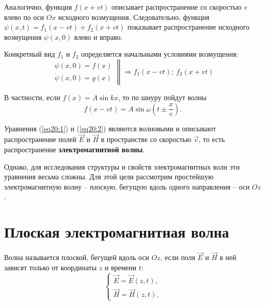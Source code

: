 	Аналогично, функция \( f(x + vt) \) описывает распространение со скоростью
    \( v \) влево по оси \( Ox \) исходного возмущения. Следовательно, функция
    \( \psi(x, t) = f_1(x - vt) + f_2(x + vt) \) показывает распространение
    исходного возмущения \( \psi(x, 0) \) влево и вправо.
	
	Конкретный вид \( f_1 \) и \( f_2 \) определяется начальными условиями
    возмущения:
	\[
        \left.
        \begin{array}{l}
            \psi(x, 0) = f(x) \\
            \dot{\psi}(x, 0) = g(x)
        \end{array}
        \right\|
        \Rightarrow f_1(x -vt); \ f_2(x + vt)
    \]
	
	В частности, если \( f(x) = A\sin kx \), то по шнуру пойдут волны
	\[
        f(x - vt) = A\sin\omega\left(t \pm \frac{x}{v}\right).
    \]
	
	\begin{conclusion}
        Уравнения (\ref{eq20:1}) и (\ref{eq20:2}) являются волновыми и описывают
        распространение полей \( \vec{E} \) и \( \vec{H} \) в пространстве со
        скоростью \( \vec{v} \), то есть распространение
        \textbf{электромагнитной волны}.
	\end{conclusion}
	
	Однако, для исследования структуры и свойств электромагнитных волн эти
    уравнения весьма сложны. Для этой цели рассмотрим простейшую
    электромагнитную волну -- \textit{плоскую}, бегущую вдоль одного направления
    -- оси \( Oz \).
	
\section{Плоская электромагнитная волна}

	\begin{definition}
        Волна называется плоской, бегущей вдоль оси \( Oz \), если поля
        \( \vec{E} \) и \( \vec{H} \) в ней зависят только от координаты
        \( z \) и времени \( t \):
        \[
            \left\{
            \begin{array}{l}
                \vec{E} = \vec{E}(z, t), \\
                \vec{H} = \vec{H}(z, t).
            \end{array}
            \right.    
        \]
	\end{definition}
	
